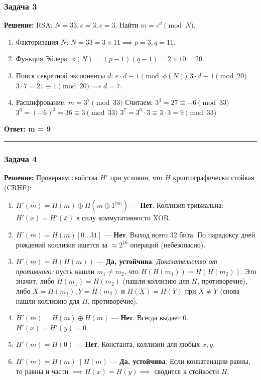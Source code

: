 ﻿\documentclass[9pt,a4paper]{extarticle}
\newcommand{\tightlist}{}
\begin{document}
\subsubsection{Задача 3}\label{ux437ux430ux434ux430ux447ux430-3}

\textbf{Решение:} RSA: \(N=33, e=3, c=3\). Найти \(m = c^d \pmod N\).

\begin{enumerate}
\def\labelenumi{\arabic{enumi}.}
\tightlist
\item
  Факторизация \(N\): \(N = 33 = 3 \times 11 \implies p=3, q=11\).
\item
  Функция Эйлера: \(\phi(N) = (p-1)(q-1) = 2 \times 10 = 20\).
\item
  Поиск секретной экспоненты \(d\): \(e \cdot d \equiv 1 \pmod{\phi(N)}\) \(3 \cdot d \equiv 1 \pmod{20}\) \(3 \cdot 7 = 21 \equiv 1 \pmod{20} \implies d = 7\).
\item
  Расшифрование: \(m = 3^7 \pmod{33}\) Считаем: \(3^3 = 27 \equiv -6 \pmod{33}\) \(3^6 = (-6)^2 = 36 \equiv 3 \pmod{33}\) \(3^7 = 3^6 \cdot 3 \equiv 3 \cdot 3 = 9 \pmod{33}\)
\end{enumerate}

\textbf{Ответ: m = 9}

\begin{center}\rule{0.5\linewidth}{0.5pt}\end{center}

\subsubsection{Задача 4}\label{ux437ux430ux434ux430ux447ux430-4}

\textbf{Решение:} Проверяем свойства \(H'\) при условии, что \(H\) криптографически стойкая (CRHF):

\begin{enumerate}
\def\labelenumi{\arabic{enumi}.}
\tightlist
\item
  \(H'(m) = H(m) \oplus H(m \oplus 1^{|m|})\) --- \textbf{Нет}. Коллизия тривиальна: \(H'(x) = H'(\bar{x})\) в силу коммутативности XOR.
\item
  \(H'(m) = H(m)[0\dots31]\) --- \textbf{Нет}. Выход всего 32 бита. По парадоксу дней рождений коллизия ищется за \(\approx 2^{16}\) операций (небезопасно).
\item
  \(H'(m) = H(H(m))\) --- \textbf{Да, устойчива}. \emph{Доказательство от противного:} пусть нашли \(m_1 \neq m_2\), что \(H(H(m_1)) = H(H(m_2))\). Это значит, либо \(H(m_1) = H(m_2)\) (нашли коллизию для \(H\), противоречие), либо \(X = H(m_1), Y = H(m_2)\) и \(H(X) = H(Y)\) при \(X \neq Y\) (снова нашли коллизию для \(H\), противоречие).
\item
  \(H'(m) = H(m) \oplus H(m)\) --- \textbf{Нет}. Всегда выдает 0. \(H'(x) = H'(y) = 0\).
\item
  \(H'(m) = H(0)\) --- \textbf{Нет}. Константа, коллизии для любых \(x, y\).
\item
  \(H'(m) = H(m) \parallel H(m)\) --- \textbf{Да, устойчива}. Если конкатенации равны, то равны и части \(\implies H(x)=H(y) \implies\) сводится к стойкости \(H\).
\end{enumerate}
\end{document}
